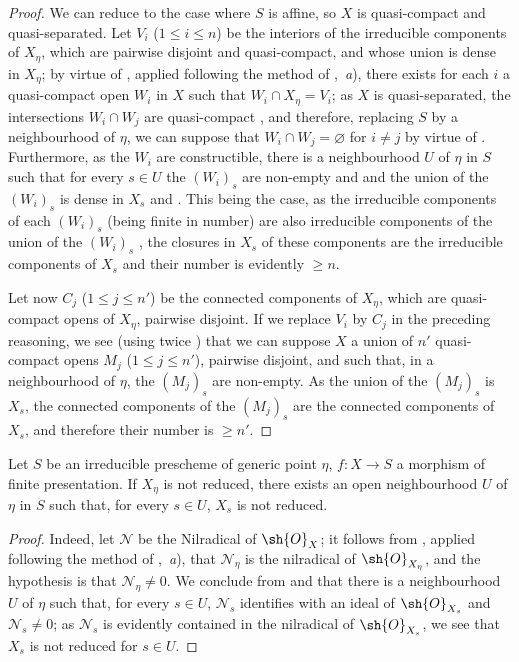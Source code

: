 \begin{proof}
We can reduce to the case where $S$ is affine, so $X$ is quasi-compact and quasi-separated.
Let $V_i$ ($1\leqslant i\leqslant n$) be the interiors of the irreducible components of $X_\eta$, which are pairwise disjoint and quasi-compact, and whose union is dense in $X_\eta$; by virtue of , applied following the method of ,~\emph{a}), there exists for each $i$ a quasi-compact open $W_i$ in $X$ such that $W_i\cap X_\eta=V_i$; as $X$ is quasi-separated, the intersections $W_i\cap W_j$ are quasi-compact , and therefore, replacing $S$ by a neighbourhood of $\eta$, we can suppose that $W_i\cap W_j=\varnothing$ for $i\neq j$ by virtue of .
Furthermore, as the $W_i$ are constructible, there is a neighbourhood $U$ of $\eta$ in $S$ such that for every $s\in U$ the $(W_i)_s$ are non-empty  and  and the union of the $(W_i)_s$ is dense in $X_s$  and .
This being the case, as the irreducible components of each $(W_i)_s$ (being finite in number) are also irreducible components of the union of the $(W_i)_s$ , the closures in $X_s$ of these components are the irreducible components of $X_s$  and their number is evidently $\geqslant n$.

Let now $C_j$ ($1\leqslant j\leqslant n'$) be the connected components of $X_\eta$, which are quasi-compact opens of $X_\eta$, pairwise disjoint.
If we replace $V_i$ by $C_j$ in the preceding reasoning, we see (using twice ) that we can suppose $X$ a union of $n'$ quasi-compact opens $M_j$ ($1\leqslant j\leqslant n'$), pairwise disjoint, and such that, in a neighbourhood of $\eta$, the $(M_j)_s$ are non-empty.
As the union of the $(M_j)_s$ is $X_s$, the connected components of the $(M_j)_s$ are the connected components of $X_s$, and therefore their number is $\geqslant n'$.
\end{proof}


\begin{lemma}[9.7.2]
\label{IV.9.7.2}
Let $S$ be an irreducible prescheme of generic point $\eta$, $f:X\to S$ a morphism of finite presentation.
If $X_\eta$ is not reduced, there exists an open neighbourhood $U$ of $\eta$ in $S$ such that, for every $s\in U$, $X_s$ is not reduced.
\end{lemma}

\begin{proof}
Indeed, let $\mathscr{N}$ be the Nilradical of $\sh{O}_X$; it follows from , applied following the method of ,~\emph{a}), that $\mathscr{N}_\eta$ is the nilradical of $\sh{O}_{X_\eta}$, and the hypothesis is that $\mathscr{N}_\eta\neq 0$.
We conclude from  and  that there is a neighbourhood $U$ of $\eta$ such that, for every $s\in U$, $\mathscr{N}_s$ identifies with an ideal of $\sh{O}_{X_s}$ and $\mathscr{N}_s\neq 0$; as $\mathscr{N}_s$ is evidently contained in the nilradical of $\sh{O}_{X_s}$, we see that $X_s$ is not reduced for $s\in U$.
\end{proof}

